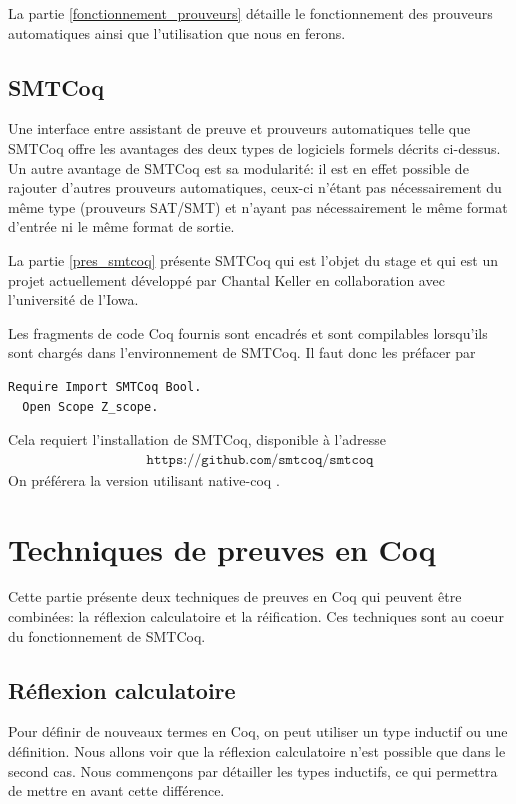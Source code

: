 \documentclass[11pt]{article}
\begin{document}
La partie \ref{fonctionnement_prouveurs} détaille le fonctionnement des prouveurs automatiques ainsi que l'utilisation que nous en ferons.


\subsection{SMTCoq}

Une interface entre assistant de preuve et prouveurs automatiques telle que SMTCoq offre les avantages des deux types de logiciels formels décrits ci-dessus. Un autre avantage de SMTCoq est sa modularité: il est en effet possible de rajouter d'autres prouveurs automatiques, ceux-ci n'étant pas nécessairement du même type (prouveurs SAT/SMT) et n'ayant pas nécessairement le même format d'entrée ni le même format de sortie. \medbreak


La partie \ref{pres_smtcoq} présente SMTCoq qui est l'objet du stage et qui est un projet actuellement développé par Chantal Keller en collaboration avec l'université de l'Iowa. \medbreak

Les fragments de code Coq fournis sont encadrés et sont compilables lorsqu'ils sont chargés dans l'environnement de SMTCoq. Il faut donc les préfacer par
\begin{lstlisting}[frame=single]
  Require Import SMTCoq Bool.
  Open Scope Z_scope.
\end{lstlisting}
Cela requiert l'installation de SMTCoq, disponible à l'adresse
\begin{align*}
    \texttt{https://github.com/smtcoq/smtcoq}
\end{align*}
On préférera la version utilisant native-coq \cite{native-coq}.


\newpage

\section{Techniques de preuves en Coq} \label{coq}

Cette partie présente deux techniques de preuves en Coq qui peuvent être combinées: la réflexion calculatoire et la réification. Ces techniques sont au coeur du fonctionnement de SMTCoq.


\subsection{Réflexion calculatoire}

Pour définir de nouveaux termes en Coq, on peut utiliser un type inductif ou une définition. Nous allons voir que la réflexion calculatoire n'est possible que dans le second cas. Nous commençons par détailler les types inductifs, ce qui permettra de mettre en avant cette différence.
\end{document}
